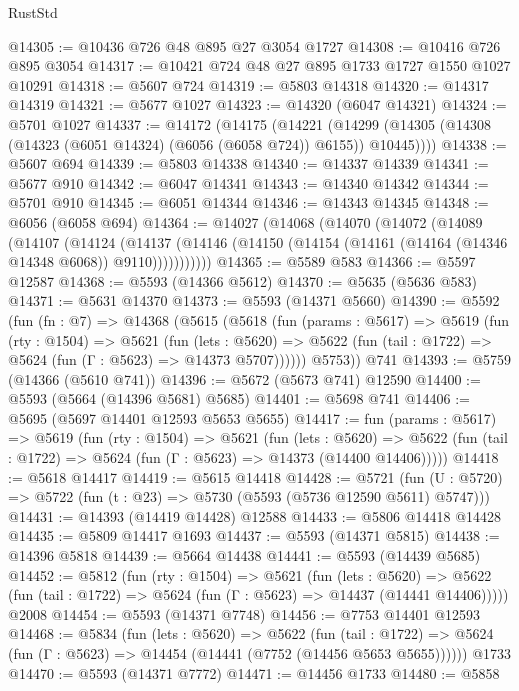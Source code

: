 \begin{lexlean}{RustStd}
\begin{coremodule}
@14305 := @10436 @726 @48 @895 @27 @3054 @1727
@14308 := @10416 @726 @895 @3054
@14317 := @10421 @724 @48 @27 @895 @1733 @1727 @1550 @1027 @10291
@14318 := @5607 @724
@14319 := @5803 @14318
@14320 := @14317 @14319
@14321 := @5677 @1027
@14323 := @14320 (@6047 @14321)
@14324 := @5701 @1027
@14337 := @14172
    (@14175
      (@14221 (@14299 (@14305 (@14308 (@14323 (@6051 @14324) (@6056 (@6058 @724)) @6155)) @10445))))
@14338 := @5607 @694
@14339 := @5803 @14338
@14340 := @14337 @14339
@14341 := @5677 @910
@14342 := @6047 @14341
@14343 := @14340 @14342
@14344 := @5701 @910
@14345 := @6051 @14344
@14346 := @14343 @14345
@14348 := @6056 (@6058 @694)
@14364 := @14027
    (@14068
      (@14070
        (@14072
          (@14089
            (@14107
              (@14124
                (@14137
                  (@14146 (@14150 (@14154 (@14161 (@14164 (@14346 @14348 @6068)) @9110)))))))))))
@14365 := @5589 @583
@14366 := @5597 @12587
@14368 := @5593 (@14366 @5612)
@14370 := @5635 (@5636 @583)
@14371 := @5631 @14370
@14373 := @5593 (@14371 @5660)
@14390 := @5592
    (fun (fn : @7) =>
    @14368
      (@5615
        (@5618
          (fun (params : @5617) =>
          @5619
            (fun (rty : @1504) =>
            @5621
              (fun (lets : @5620) =>
              @5622 (fun (tail : @1722) => @5624 (fun (Γ : @5623) => @14373 @5707))))))
        @5753))
    @741
@14393 := @5759 (@14366 (@5610 @741))
@14396 := @5672 (@5673 @741) @12590
@14400 := @5593 (@5664 (@14396 @5681) @5685)
@14401 := @5698 @741
@14406 := @5695 (@5697 @14401 @12593 @5653 @5655)
@14417 := fun (params : @5617) =>
  @5619
    (fun (rty : @1504) =>
    @5621
      (fun (lets : @5620) =>
      @5622 (fun (tail : @1722) => @5624 (fun (Γ : @5623) => @14373 (@14400 @14406)))))
@14418 := @5618 @14417
@14419 := @5615 @14418
@14428 := @5721
    (fun (U : @5720) => @5722 (fun (t : @23) => @5730 (@5593 (@5736 @12590 @5611) @5747)))
@14431 := @14393 (@14419 @14428) @12588
@14433 := @5806 @14418 @14428
@14435 := @5809 @14417 @1693
@14437 := @5593 (@14371 @5815)
@14438 := @14396 @5818
@14439 := @5664 @14438
@14441 := @5593 (@14439 @5685)
@14452 := @5812
    (fun (rty : @1504) =>
    @5621
      (fun (lets : @5620) =>
      @5622 (fun (tail : @1722) => @5624 (fun (Γ : @5623) => @14437 (@14441 @14406)))))
    @2008
@14454 := @5593 (@14371 @7748)
@14456 := @7753 @14401 @12593
@14468 := @5834
    (fun (lets : @5620) =>
    @5622
      (fun (tail : @1722) =>
      @5624 (fun (Γ : @5623) => @14454 (@14441 (@7752 (@14456 @5653 @5655))))))
    @1733
@14470 := @5593 (@14371 @7772)
@14471 := @14456 @1733
@14480 := @5858

\end{coremodule}
\end{lexlean}
